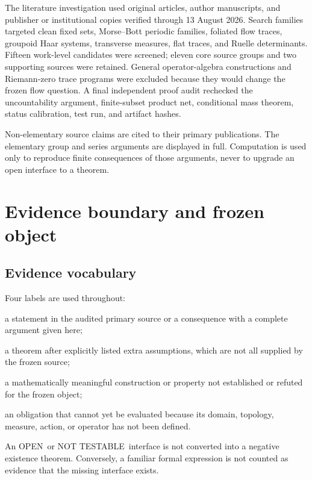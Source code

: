 \documentclass[11pt]{article}
\theoremstyle{definition}
\theoremstyle{remark}
\newcommand{\proved}{\textsf{PROVED}}
\newcommand{\conditional}{\textsf{CONDITIONAL}}
\newcommand{\openclaim}{\textsf{OPEN}}
\newcommand{\nottest}{\textsf{NOT TESTABLE}}
\begin{document}
The literature investigation used original articles, author manuscripts, and
publisher or institutional copies verified through 13 August 2026.  Search
families targeted clean fixed sets, Morse--Bott periodic families, foliated
flow traces, groupoid Haar systems, transverse measures, flat traces, and
Ruelle determinants.  Fifteen work-level candidates were screened; eleven
core source groups and two supporting sources were retained.  General
operator-algebra constructions and Riemann-zero trace programs were excluded
because they would change the frozen flow question.  A final independent
proof audit rechecked the uncountability argument, finite-subset product net,
conditional mass theorem, status calibration, test run, and artifact hashes.

Non-elementary source claims are cited to their primary publications.  The
elementary group and series arguments are displayed in full.  Computation is
used only to reproduce finite consequences of those arguments, never to
upgrade an open interface to a theorem.

\section{Evidence boundary and frozen object}
\label{sec:boundary}

\subsection{Evidence vocabulary}

Four labels are used throughout:
\begin{description}[leftmargin=3.0cm,style=nextline]
 \item[\proved] a statement in the audited primary source or a consequence
 with a complete argument given here;
 \item[\conditional] a theorem after explicitly listed extra assumptions,
 which are not all supplied by the frozen source;
 \item[\openclaim] a mathematically meaningful construction or property not
 established or refuted for the frozen object;
 \item[\nottest] an obligation that cannot yet be evaluated because its
 domain, topology, measure, action, or operator has not been defined.
\end{description}
An \openclaim\ or \nottest\ interface is not converted into a negative
existence theorem.  Conversely, a familiar formal expression is not counted
as evidence that the missing interface exists.
\end{document}
